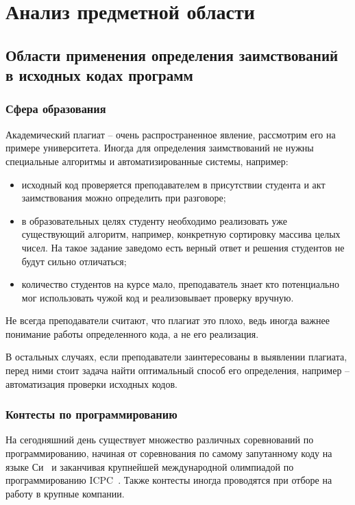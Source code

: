 \section{Анализ предметной области}

\subsection{Области применения определения заимствований в исходных кодах программ}
\subsubsection{Сфера образования}

Академический плагиат -- очень распространенное явление, рассмотрим его на примере университета. Иногда для определения заимствований не нужны специальные алгоритмы и автоматизированные системы, например:
\begin{itemize}[label*=---]
	\item исходный код проверяется преподавателем в присутствии студента и акт заимствования можно определить при разговоре;
	\item в образовательных целях студенту необходимо реализовать уже существующий алгоритм, например, конкретную сортировку массива целых  чисел. На такое задание заведомо есть верный ответ и решения студентов не будут сильно отличаться;
	\item количество студентов на курсе мало, преподаватель знает кто потенциально мог использовать чужой код и реализовывает проверку вручную.
\end{itemize}

Не всегда преподаватели считают, что плагиат это плохо, ведь иногда важнее понимание работы определенного кода, а не его реализация.

В остальных случаях, если преподаватели заинтересованы в выявлении плагиата, перед ними стоит задача найти оптимальный способ его определения, например --  автоматизация проверки исходных кодов.  

\subsubsection{Контесты по программированию}

На сегодняшний день существует множество различных соревнований по программированию, начиная от соревнования по самому запутанному коду на языке Си~\cite{ioccc} и заканчивая крупнейшей международной олимпиадой по программированию ICPC~\cite{icpc}. Также контесты иногда проводятся при отборе на работу в крупные компании.

